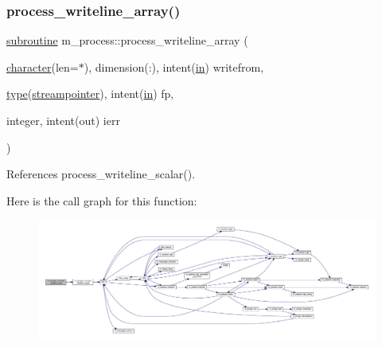\subsubsection{\texorpdfstring{process\+\_\+writeline\+\_\+array()}{process\_writeline\_array()}}
{\footnotesize\ttfamily \hyperlink{M__stopwatch_83_8txt_acfbcff50169d691ff02d4a123ed70482}{subroutine} m\+\_\+process\+::process\+\_\+writeline\+\_\+array (\begin{DoxyParamCaption}\item[{\hyperlink{option__stopwatch_83_8txt_abd4b21fbbd175834027b5224bfe97e66}{character}(len=$\ast$), dimension(\+:), intent(\hyperlink{M__journal_83_8txt_afce72651d1eed785a2132bee863b2f38}{in})}]{writefrom,  }\item[{\hyperlink{stop__watch_83_8txt_a70f0ead91c32e25323c03265aa302c1c}{type}(\hyperlink{structm__process_1_1streampointer}{streampointer}), intent(\hyperlink{M__journal_83_8txt_afce72651d1eed785a2132bee863b2f38}{in})}]{fp,  }\item[{integer, intent(out)}]{ierr }\end{DoxyParamCaption})\hspace{0.3cm}{\ttfamily [private]}}



References process\+\_\+writeline\+\_\+scalar().

Here is the call graph for this function\+:
\nopagebreak
\begin{figure}[H]
\begin{center}
\leavevmode
\includegraphics[width=350pt]{namespacem__process_a08887a918eba167ceacddf58ca084270_cgraph}
\end{center}
\end{figure}
\mbox{\label{namespacem__process_a72527c0ec0af26dcb14b8bfad6dcd482}} 
